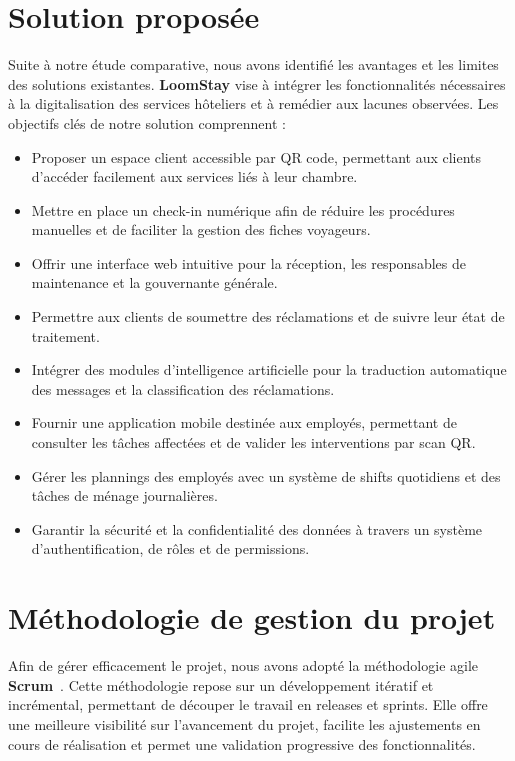 \section{Solution proposée}
Suite à notre étude comparative, nous avons identifié les avantages et les limites des solutions existantes. \textbf{LoomStay} vise à intégrer les fonctionnalités nécessaires à la digitalisation des services hôteliers et à remédier aux lacunes observées. Les objectifs clés de notre solution comprennent :
\begin{itemize}
\item Proposer un espace client accessible par QR code, permettant aux clients d'accéder facilement aux services liés à leur chambre.
\item Mettre en place un check-in numérique afin de réduire les procédures manuelles et de faciliter la gestion des fiches voyageurs.
\item Offrir une interface web intuitive pour la réception, les responsables de maintenance et la gouvernante générale.
\item Permettre aux clients de soumettre des réclamations et de suivre leur état de traitement.
\item Intégrer des modules d'intelligence artificielle pour la traduction automatique des messages et la classification des réclamations.
\item Fournir une application mobile destinée aux employés, permettant de consulter les tâches affectées et de valider les interventions par scan QR.
\item Gérer les plannings des employés avec un système de shifts quotidiens et des tâches de ménage journalières.
\item Garantir la sécurité et la confidentialité des données à travers un système d'authentification, de rôles et de permissions.
\end{itemize}

\section{Méthodologie de gestion du projet}
Afin de gérer efficacement le projet, nous avons adopté la méthodologie agile \textbf{Scrum}~\cite{schwaber2020scrum}. Cette méthodologie repose sur un développement itératif et incrémental, permettant de découper le travail en releases et sprints. Elle offre une meilleure visibilité sur l'avancement du projet, facilite les ajustements en cours de réalisation et permet une validation progressive des fonctionnalités.

